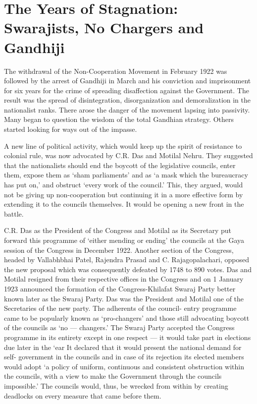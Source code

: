 \chapter[The Years of Stagnation]{The Years of Stagnation: Swarajists, No Chargers and Gandhiji}
\begin{multicols}{2}

The withdrawal of the Non-Cooperation Movement in February 1922 was followed by the arrest of Gandhiji in March and his conviction and imprisonment for six years for the crime of spreading disaffection against the Government. The result was the spread of disintegration, disorganization and demoralization in the nationalist ranks. There arose the danger of the movement lapsing into passivity. Many began to question the wisdom of the total Gandhian strategy. Others started looking for ways out of the impasse.

A new line of political activity, which would keep up the spirit of resistance to colonial rule, was now advocated by C.R. Das and Motilal Nehru. They suggested that the nationalists should end the boycott of the legislative councils, enter them, expose them as `sham parliaments' and as `a mask which the bureaucracy has put on,' and obstruct `every work of the council.' This, they argued, would not be giving up non-cooperation but continuing it in a more effective form by extending it to the councils themselves. It would be opening a new front in the battle.

C.R. Das as the President of the Congress and Motilal as its Secretary put forward this programme of `either mending or ending' the councils at the Gaya session of the Congress in December 1922. Another section of the Congress, headed by Vallabhbhai Patel, Rajendra Prasad and C. Rajagopalachari, opposed the new proposal which was consequently defeated by 1748 to 890 votes. Das and Motilal resigned from their respective offices in the Congress and on 1 January 1923 announced the formation of the Congress-Khilafat Swaraj Party better known later as the Swaraj Party. Das was the President and Motilal one of the Secretaries of the new party. The adherents of the council- entry programme came to be popularly known as `pro-changers' and those still advocating boycott of the councils as `no --- changers.' The Swaraj Party accepted the Congress programme in its entirety except in one respect --- it would take part in elections due later in the `ear It declared that it would present the national demand for self- government in the councils and in case of its rejection its elected members would adopt `a policy of uniform, continuous and consistent obstruction within the councils, with a view to make the Government through the councils impossible.' The councils would, thus, be wrecked from within by creating deadlocks on every measure that came before them.


\end{multicols}
